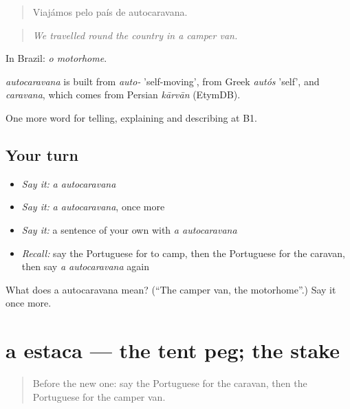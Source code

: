 \begin{quote}
Viajámos pelo país de autocaravana.
\end{quote}

\begin{quote}
\emph{We travelled round the country in a camper van.}
\end{quote}

In Brazil: \emph{o motorhome}.

\begin{cousinweb}
\emph{autocaravana} is built from \emph{auto-} 'self-moving', from Greek \emph{autós} 'self', and \emph{caravana}, which comes from Persian \emph{kārvān} (EtymDB).
\end{cousinweb}

\begin{grammarlens}[title={What you've built}]
One more word for telling, explaining and describing at B1.
\end{grammarlens}

\subsection*{Your turn}
\begin{itemize}
\raggedright
  \item \emph{Say it:} \emph{a autocaravana}
  \item \emph{Say it:} \emph{a autocaravana}, once more
  \item \emph{Say it:} a sentence of your own with \emph{a autocaravana}
  \item \emph{Recall:} say the Portuguese for to camp, then the Portuguese for the caravan, then say \emph{a autocaravana} again
\end{itemize}

\begin{tcolorbox}[breakable,colback=teal!4,colframe=teal!35!black,title={Before you move on}]
What does a autocaravana mean? (\textquotedblleft{}The camper van, the motorhome\textquotedblright{}.) Say it once more.
\end{tcolorbox}
\section[a estaca]{a estaca — the tent peg; the stake}

\label{lesson:PT-C426-estaca}



\begin{quote}
Before the new one: say the Portuguese for the caravan, then the Portuguese for the camper van.
\end{quote}

